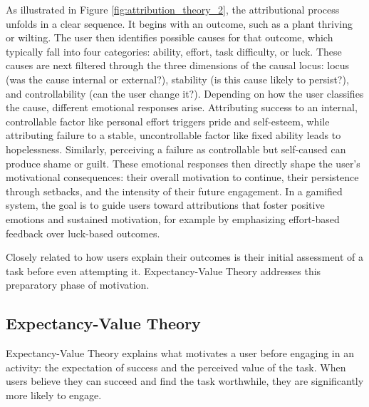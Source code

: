 As illustrated in Figure \ref{fig:attribution_theory_2}, the attributional process unfolds in a clear sequence. It begins with an outcome, such as a plant thriving or wilting. The user then identifies possible causes for that outcome, which typically fall into four categories: ability, effort, task difficulty, or luck. These causes are next filtered through the three dimensions of the causal locus: locus (was the cause internal or external?), stability (is this cause likely to persist?), and controllability (can the user change it?). Depending on how the user classifies the cause, different emotional responses arise. Attributing success to an internal, controllable factor like personal effort triggers pride and self-esteem, while attributing failure to a stable, uncontrollable factor like fixed ability leads to hopelessness. Similarly, perceiving a failure as controllable but self-caused can produce shame or guilt. These emotional responses then directly shape the user's motivational consequences: their overall motivation to continue, their persistence through setbacks, and the intensity of their future engagement. In a gamified system, the goal is to guide users toward attributions that foster positive emotions and sustained motivation, for example by emphasizing effort-based feedback over luck-based outcomes.

Closely related to how users explain their outcomes is their initial assessment of a task before even attempting it. 
Expectancy-Value Theory addresses this preparatory phase of motivation.

\subsection{Expectancy-Value Theory}

Expectancy-Value Theory explains what motivates a user before engaging in an activity: the expectation of success and the perceived value of the task.
When users believe they can succeed and find the task worthwhile, they are significantly more likely to engage.

